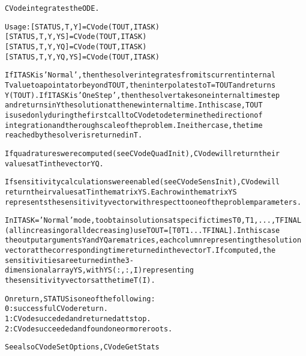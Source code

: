 \begin{alltt}
CVode integrates the ODE.

   Usage: [STATUS, T, Y] = CVode ( TOUT, ITASK ) 
          [STATUS, T, Y, YS] = CVode ( TOUT, ITASK )
          [STATUS, T, Y, YQ] = CVode  (TOUT, ITASK )
          [STATUS, T, Y, YQ, YS] = CVode ( TOUT, ITASK )

   If ITASK is 'Normal', then the solver integrates from its current internal 
   T value to a point at or beyond TOUT, then interpolates to T = TOUT and returns 
   Y(TOUT). If ITASK is 'OneStep', then the solver takes one internal time step 
   and returns in Y the solution at the new internal time. In this case, TOUT 
   is used only during the first call to CVode to determine the direction of 
   integration and the rough scale of the problem. In either case, the time 
   reached by the solver is returned in T.

   If quadratures were computed (see CVodeQuadInit), CVode will return their
   values at T in the vector YQ.

   If sensitivity calculations were enabled (see CVodeSensInit), CVode will 
   return their values at T in the matrix YS. Each row in the matrix YS
   represents the sensitivity vector with respect to one of the problem parameters.

   In ITASK =' Normal' mode, to obtain solutions at specific times T0,T1,...,TFINAL
   (all increasing or all decreasing) use TOUT = [T0 T1  ... TFINAL]. In this case
   the output arguments Y and YQ are matrices, each column representing the solution
   vector at the corresponding time returned in the vector T. If computed, the 
   sensitivities are eturned in the 3-dimensional array YS, with YS(:,:,I) representing
   the sensitivity vectors at the time T(I).

   On return, STATUS is one of the following:
     0: successful CVode return.
     1: CVode succeded and returned at tstop.
     2: CVode succeeded and found one or more roots. 


   See also CVodeSetOptions, CVodeGetStats
\end{alltt}






\vspace{0.1in}